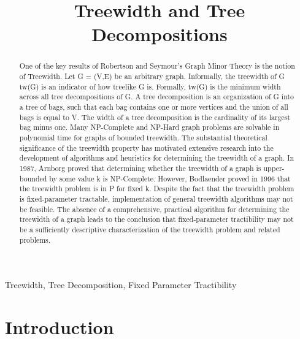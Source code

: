 \documentclass[12pt,conference]{IEEEtran}
\begin{document}
\raggedbottom

\title{Treewidth and Tree Decompositions}

\author{
}

\maketitle

\begin{abstract}
One of the key results of Robertson and Seymour's Graph Minor Theory is the notion of Treewidth. Let G = (V,E) be an arbitrary graph. Informally, the treewidth of G tw(G) is an indicator of how treelike G is. Formally, tw(G) is the minimum width across all tree decompositions of G. A tree decomposition is an organization of G into a tree of bags, such that each bag contains one or more vertices and the union of all bags is equal to V. The width of a tree decomposition is the cardinality of its largest bag minus one. Many NP-Complete and NP-Hard graph problems are solvable in polynomial time for graphs of bounded treewidth. The substantial theoretical significance of the treewidth property has motivated extensive research into the development of algorithms and heuristics for determining the treewidth of a graph. In 1987, Arnborg proved that determining whether the treewidth of a graph is upper-bounded by some value k is NP-Complete. However, Bodlaender proved in 1996 that the treewidth problem is in P for fixed k. Despite the fact that the treewidth problem is fixed-parameter tractable, implementation of general treewidth algorithms may not be feasible. The absence of a comprehensive, practical algorithm for determining the treewidth of a graph leads to the conclusion that fixed-parameter tractibility may not be a sufficiently descriptive characterization of the treewidth problem and related problems.
\end{abstract}

\begin{IEEEkeywords}
Treewidth, Tree Decomposition, Fixed Parameter Tractibility
\end{IEEEkeywords}

\IEEEpeerreviewmaketitle

\section{Introduction}
\end{document}
